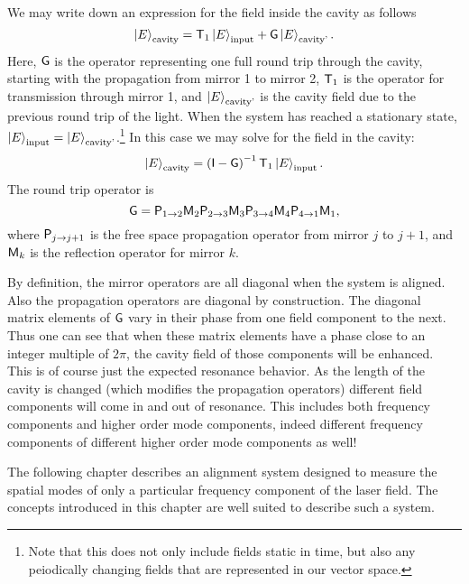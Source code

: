 We may write down an expression for the field inside the cavity as follows
\begin{equation}
\left| E \right>_{\text{cavity}} = \mathsf{T}_1\left| E \right>_{\text{input}}+\mathsf{G}\left| E \right>_{\text{cavity'}}.
\end{equation}
Here, $\mathsf{G}$ is the operator representing one full round trip through the cavity, starting with the propagation from mirror 1 to mirror 2, $\mathsf{T}_1$ is the operator for transmission through mirror 1, and $\left| E \right>_{\text{cavity'}}$ is the cavity field due to the previous round trip of the light. %
When the system has reached a stationary state, $\left| E \right>_{\text{input}}=\left| E \right>_{\text{cavity'}}$.\footnote{Note that this does not only include fields static in time, but also any peiodically changing fields that are represented in our vector space.} In this case we may solve for the field in the cavity:
\begin{equation}
\left| E \right>_{\text{cavity}} = \left(\mathsf{I}-\mathsf{G}\right)^{-1}\mathsf{T}_1\left| E \right>_{\text{input}}.
\end{equation}
The round trip operator is 
\begin{equation}
\mathsf{G} = \mathsf{P}_{1\rightarrow 2}\mathsf{M}_2\mathsf{P}_{2\rightarrow 3}\mathsf{M}_3\mathsf{P}_{3\rightarrow 4}\mathsf{M}_4\mathsf{P}_{4\rightarrow 1}\mathsf{M}_1,
\end{equation}
where $\mathsf{P}_{j\rightarrow j+1}$ is the free space propagation operator from mirror $j$ to $j+1$, and $\mathsf{M}_k$ is the reflection operator for mirror $k$.

By definition, the mirror operators are all diagonal when the system is aligned. %
Also the propagation operators are diagonal by construction. %
The diagonal matrix elements of $\mathsf{G}$ vary in their phase from one field component to the next. %
Thus one can see that when these matrix elements have a phase close to an integer multiple of $2\pi$, the cavity field of those components will be enhanced. %
This is of course just the expected resonance behavior. %
As the length of the cavity is changed (which modifies the propagation operators) different field components will come in and out of resonance. %
This includes both frequency components and higher order mode components, indeed different frequency components of different higher order mode components as well!

The following chapter describes an alignment system designed to measure the spatial modes of only a particular frequency component of the laser field. %
The concepts introduced in this chapter are well suited to describe such a system.
